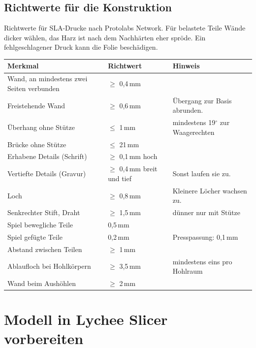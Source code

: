 \documentclass{\basedir/fablab-document}
\begin{document}
\begin{center}
	
\end{center}

\subsection{Richtwerte für die Konstruktion}

Richtwerte für SLA-Drucke nach Protolabs Network. Für belastete Teile Wände dicker wählen, das Harz ist nach dem Nachhärten eher spröde. Ein fehlgeschlagener Druck kann die Folie beschädigen.

\begin{center}
	\small
	\renewcommand{\arraystretch}{1.25}
	\begin{tabularx}{\textwidth}{|l|l|X|}
		\hline
		\textbf{Merkmal} & \textbf{Richtwert} & \textbf{Hinweis} \\ \hline
		Wand, an mindestens zwei Seiten verbunden & $\ge$ 0,4\,mm & \\ \hline
		Freistehende Wand & $\ge$ 0,6\,mm & Übergang zur Basis abrunden. \\ \hline
		Überhang ohne Stütze & $\le$ 1\,mm & mindestens 19$^\circ$ zur Waagerechten \\ \hline
		Brücke ohne Stütze & $\le$ 21\,mm & \\ \hline
		Erhabene Details (Schrift) & $\ge$ 0,1\,mm hoch & \\ \hline
		Vertiefte Details (Gravur) & $\ge$ 0,4\,mm breit und tief & Sonst laufen sie zu. \\ \hline
		Loch & $\ge$ 0,8\,mm & Kleinere Löcher wachsen zu. \\ \hline
		Senkrechter Stift, Draht & $\ge$ 1,5\,mm & dünner nur mit Stütze \\ \hline
		Spiel bewegliche Teile & 0,5\,mm & \\ \hline
		Spiel gefügte Teile & 0,2\,mm & Presspassung: 0,1\,mm \\ \hline
		Abstand zwischen Teilen & $\ge$ 1\,mm & \\ \hline
		Ablaufloch bei Hohlkörpern & $\ge$ 3,5\,mm & mindestens eins pro Hohlraum \\ \hline
		Wand beim Aushöhlen & $\ge$ 2\,mm & \\ \hline
	\end{tabularx}
\end{center}

\section{Modell in Lychee Slicer vorbereiten}
\end{document}
